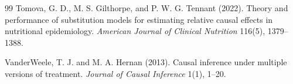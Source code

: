 \documentclass[11pt]{article}
\theoremstyle{definition}
\theoremstyle{plain}
\theoremstyle{remark}
\begin{document}
\begin{thebibliography}{99}
Tomova, G. D., M. S. Gilthorpe, and P. W. G. Tennant (2022).
Theory and performance of substitution models for estimating relative causal effects in nutritional epidemiology.
\emph{American Journal of Clinical Nutrition} 116(5), 1379--1388.

VanderWeele, T. J. and M. A. Hernan (2013).
Causal inference under multiple versions of treatment.
\emph{Journal of Causal Inference} 1(1), 1--20.
\end{thebibliography}
\end{document}
